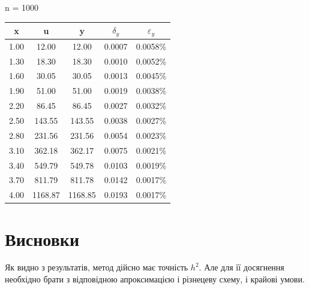 \documentclass[fontsize=14pt,DIV=1,a4paper]{scrartcl}
\begin{document}
    \vspace{10px}
    n = 1000
    \vspace{10px}

    \begin{tabular}{| c | c | c | c | c |}
        \hline
        x & u & y & $\delta_y$ & $\varepsilon_y$ \\
        \hline
        1.00 &   12.00 &   12.00 &    0.0007 &    0.0058\% \\
        1.30 &   18.30 &   18.30 &    0.0010 &    0.0052\% \\
        1.60 &   30.05 &   30.05 &    0.0013 &    0.0045\% \\
        1.90 &   51.00 &   51.00 &    0.0019 &    0.0038\% \\
        2.20 &   86.45 &   86.45 &    0.0027 &    0.0032\% \\
        2.50 &  143.55 &  143.55 &    0.0038 &    0.0027\% \\
        2.80 &  231.56 &  231.56 &    0.0054 &    0.0023\% \\
        3.10 &  362.18 &  362.17 &    0.0075 &    0.0021\% \\
        3.40 &  549.79 &  549.78 &    0.0103 &    0.0019\% \\
        3.70 &  811.79 &  811.78 &    0.0142 &    0.0017\% \\
        4.00 & 1168.87 & 1168.85 &    0.0193 &    0.0017\% \\
        \hline
    \end{tabular}

	
	\newpage
	\section*{Висновки}
	
	Як видно з результатів, метод дійсно має точність $h^2$. Але для її досягнення необхідно брати з відповідною апроксимацією і різнецеву схему, і крайові умови.
\end{document}

